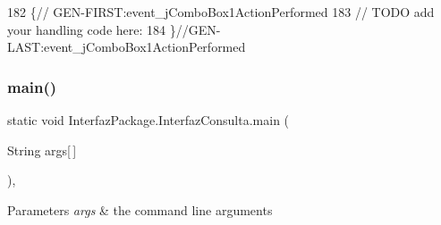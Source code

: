 \begin{DoxyCode}
182                                                                            \{\textcolor{comment}{//
      GEN-FIRST:event\_jComboBox1ActionPerformed}
183         \textcolor{comment}{// TODO add your handling code here:}
184     \}\textcolor{comment}{//GEN-LAST:event\_jComboBox1ActionPerformed}
\end{DoxyCode}
\mbox{\label{class_interfaz_package_1_1_interfaz_consulta_a8d2a8ac33a962434617daf40c394da2d}} 
\subsubsection{\texorpdfstring{main()}{main()}}
{\footnotesize\ttfamily static void Interfaz\+Package.\+Interfaz\+Consulta.\+main (\begin{DoxyParamCaption}\item[{String}]{args\mbox{[}$\,$\mbox{]} }\end{DoxyParamCaption})\hspace{0.3cm}{\ttfamily [inline]}, {\ttfamily [static]}}


\begin{DoxyParams}{Parameters}
{\em args} & the command line arguments \\
\hline
\end{DoxyParams}

